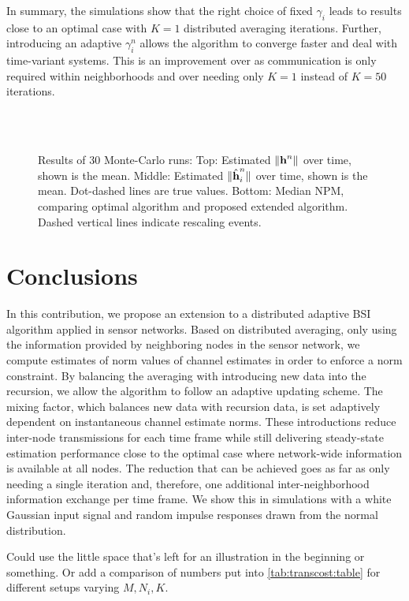\documentclass{article}
\begin{document}
In summary, the simulations show that the right choice of fixed \(\gamma_i\) leads to results close to an optimal case with \(K=1\) distributed averaging iterations.
Further, introducing an adaptive \(\gamma_i^n\) allows the algorithm to converge faster and deal with time-variant systems.
This is an improvement over \cite{blochbergerDBSI} as communication is only required within neighborhoods and over \cite{liuDistributedBlindIdentification2016,liuDistributedRecursiveBlind2017} needing only \(K=1\) instead of \(K=50\) iterations.


\begin{figure}[t]
    \centering
    \\\vspace*{-1.0cm}
    \\\vspace*{-1.0cm}
    
    \vspace*{-0.6cm}
    \caption[]{Results of 30 Monte-Carlo runs: Top: Estimated \(\|\bm{\mathrm{h}}^n\|\) over time, shown is the mean. Middle: Estimated \(\|\hat{\bm{\mathrm{h}}}_i^n\|\) over time, shown is the mean. Dot-dashed lines are true values. Bottom: Median NPM, comparing optimal algorithm and proposed extended algorithm. Dashed vertical lines indicate rescaling events.}
    \label{fig:simulations:NPMtimedyn}
\end{figure}

\section[]{Conclusions}
\label{sec:conclusions}
In this contribution, we propose an extension to a distributed adaptive BSI algorithm applied in sensor networks.
Based on distributed averaging, only using the information provided by neighboring nodes in the sensor network, we compute estimates of norm values of channel estimates in order to enforce a norm constraint.
By balancing the averaging with introducing new data into the recursion, we allow the algorithm to follow an adaptive updating scheme.
The mixing factor, which balances new data with recursion data, is set adaptively dependent on instantaneous channel estimate norms.
These introductions reduce inter-node transmissions for each time frame while still delivering steady-state estimation performance close to the optimal case where network-wide information is available at all nodes.
The reduction that can be achieved goes as far as only needing a single iteration and, therefore, one additional inter-neighborhood information exchange per time frame.
We show this in simulations with a white Gaussian input signal and random impulse responses drawn from the normal distribution.
\begin{todo}
    Could use the little space that's left for an illustration in the beginning or something. Or add a comparison of numbers put into \autoref{tab:transcost:table} for different setups varying \(M,N_i,K\).
\end{todo}
\end{document}
